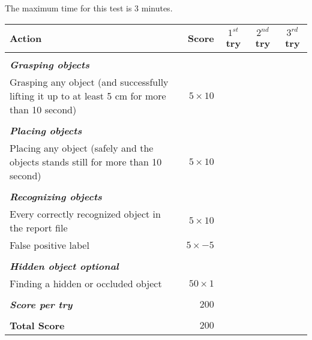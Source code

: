 
The maximum time for this test is 3 minutes.


\begin{tabularx}{\textwidth}{X r c c c }

	\textbf{Action} & \textbf{Score} & \textbf{$1^{st}$ try} & \textbf{$2^{nd}$ try} & \textbf{$3^{rd}$ try} \\ \hline
	& & & & \\ 
	\textit{\textbf{Grasping objects}} \\
	Grasping any object (and successfully lifting it up to at least 5 cm for more than 10 second) & $5 \times 10$ & \hrulefill & \hrulefill & \hrulefill \\
	& & & & \\ 
	\textit{\textbf{Placing objects}} \\
	Placing any object (safely and the objects stands still for more than 10 second) & $5 \times 10$ & \hrulefill & \hrulefill & \hrulefill \\
	& & & & \\ 
	\textit{\textbf{Recognizing objects}} \\
	Every correctly recognized object in the report file & $5 \times 10$ & \hrulefill & \hrulefill & \hrulefill \\
	False positive label & $5 \times -5$ & \hrulefill & \hrulefill & \hrulefill \\
	& & & & \\ 
	\textit{\textbf{Hidden object optional}} \\
	Finding a hidden or occluded object & $50 \times 1$ & \hrulefill & \hrulefill & \hrulefill \\ \hline
	& & & & \\ 
	\textit{\textbf{Score per try}} & $200$ & \hrulefill & \hrulefill & \hrulefill \\ 
	& & & & \\ 
	\textbf{Total Score} & $200$ & & & \\ \cline{3-5}

\end{tabularx}\\


